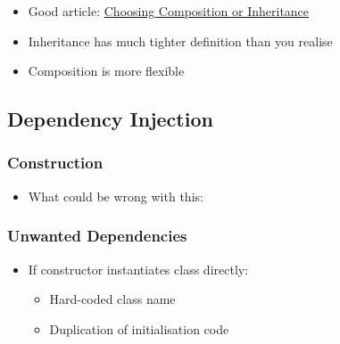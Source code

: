 \begin{itemize}
\itemsep1pt\parskip0pt
\item
  Good article:
  \href{https://www.thoughtworks.com/insights/blog/composition-vs-inheritance-how-choose}{Choosing
  Composition or Inheritance}
\item
  Inheritance has much tighter definition than you realise
\item
  Composition is more flexible
\end{itemize}

\subsection{Dependency Injection}\label{dependency-injection}

\subsubsection{Construction}\label{construction}

\begin{itemize}
\itemsep1pt\parskip0pt
\item
  What could be wrong with this:
\end{itemize}

\begin{Shaded}
\begin{Highlighting}[]

 
\NormalTok{\};}

 
\NormalTok{:}
  \NormalTok{\{}
     
  \NormalTok{\}}

\NormalTok{:}
\NormalTok{\};}

 
\NormalTok{\{}
\NormalTok{\}}

\end{Highlighting}
\end{Shaded}

\subsubsection{Unwanted Dependencies}\label{unwanted-dependencies}

\begin{itemize}
\itemsep1pt\parskip0pt
\item
  If constructor instantiates class directly:

  \begin{itemize}
  \itemsep1pt\parskip0pt
  \item
    Hard-coded class name
  \item
    Duplication of initialisation code
  \end{itemize}
\end{itemize}

